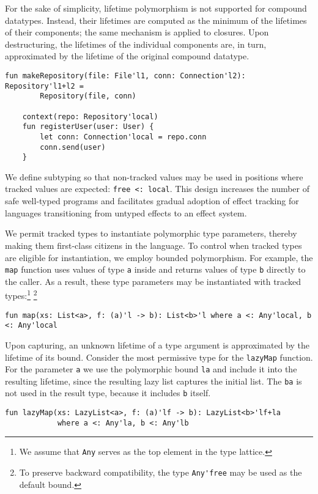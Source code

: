 \documentclass[acmsmall,review,screen]{acmart}
\begin{document}
For the sake of simplicity, lifetime polymorphism is not supported for compound datatypes.
Instead, their lifetimes are computed as the minimum of the lifetimes of their components; the same mechanism is applied to closures.
Upon destructuring, the lifetimes of the individual components are, in turn, approximated by the lifetime of the original compound datatype.
\begin{lstlisting}[language=colang]
    fun makeRepository(file: File'l1, conn: Connection'l2): Repository'l1+l2 =
        Repository(file, conn)

    context(repo: Repository'local)
    fun registerUser(user: User) {
        let conn: Connection'local = repo.conn
        conn.send(user)
    }
\end{lstlisting}

We define subtyping so that non-tracked values may be used in positions where tracked values are expected: \lstinline[language=colang]|free <: local|.
This design increases the number of safe well-typed programs and facilitates gradual adoption of effect tracking for languages transitioning from untyped effects to an effect system.

We permit tracked types to instantiate polymorphic type parameters, thereby making them first-class citizens in the language.
To control when tracked types are eligible for instantiation, we employ bounded polymorphism.
For example, the \lstinline[language=colang]|map| function uses values of type \lstinline[language=colang]|a| inside and returns values of type \lstinline[language=colang]|b| directly to the caller.
As a result, these type parameters may be instantiated with tracked types:\footnote{We assume that \lstinline[language=colang]|Any| serves as the top element in the type lattice.} \footnote{To preserve backward compatibility, the type \lstinline[language=colang]|Any'free| may be used as the default bound.}
\begin{lstlisting}[language=colang]
    fun map(xs: List<a>, f: (a)'l -> b): List<b>'l where a <: Any'local, b <: Any'local
\end{lstlisting}

Upon capturing, an unknown lifetime of a type argument is approximated by the lifetime of its bound.
Consider the most permissive type for the \lstinline[language=colang]|lazyMap| function.
For the parameter \lstinline[language=colang]|a| we use the polymorphic bound \lstinline[language=colang]|la| and include it into the resulting lifetime, since the resulting lazy list captures the initial list.
The \lstinline[language=colang]|ba| is not used in the result type, because it includes \lstinline[language=colang]|b| itself.
\begin{lstlisting}[language=colang]
    fun lazyMap(xs: LazyList<a>, f: (a)'lf -> b): LazyList<b>'lf+la
            where a <: Any'la, b <: Any'lb
\end{lstlisting}
\end{document}
